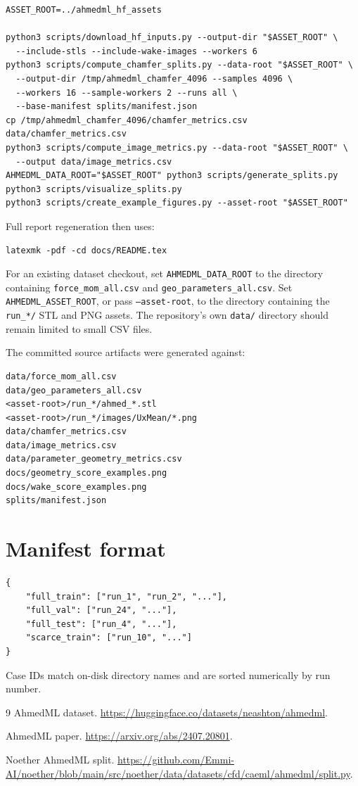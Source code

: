 \documentclass[10pt]{article}
\newcommand{\code}[1]{\texttt{#1}}
\begin{document}
\begin{verbatim}
ASSET_ROOT=../ahmedml_hf_assets

python3 scripts/download_hf_inputs.py --output-dir "$ASSET_ROOT" \
  --include-stls --include-wake-images --workers 6
python3 scripts/compute_chamfer_splits.py --data-root "$ASSET_ROOT" \
  --output-dir /tmp/ahmedml_chamfer_4096 --samples 4096 \
  --workers 16 --sample-workers 2 --runs all \
  --base-manifest splits/manifest.json
cp /tmp/ahmedml_chamfer_4096/chamfer_metrics.csv data/chamfer_metrics.csv
python3 scripts/compute_image_metrics.py --data-root "$ASSET_ROOT" \
  --output data/image_metrics.csv
AHMEDML_DATA_ROOT="$ASSET_ROOT" python3 scripts/generate_splits.py
python3 scripts/visualize_splits.py
python3 scripts/create_example_figures.py --asset-root "$ASSET_ROOT"
\end{verbatim}

Full report regeneration then uses:

\begin{verbatim}
latexmk -pdf -cd docs/README.tex
\end{verbatim}

For an existing dataset checkout, set \code{AHMEDML\_DATA\_ROOT} to the
directory containing \code{force\_mom\_all.csv} and
\code{geo\_parameters\_all.csv}. Set \code{AHMEDML\_ASSET\_ROOT}, or pass
\code{--asset-root}, to the directory containing the \code{run\_*/} STL and
PNG assets. The repository's own \code{data/} directory should remain limited
to small CSV files.

The committed source artifacts were generated against:

\begin{verbatim}
data/force_mom_all.csv
data/geo_parameters_all.csv
<asset-root>/run_*/ahmed_*.stl
<asset-root>/run_*/images/UxMean/*.png
data/chamfer_metrics.csv
data/image_metrics.csv
data/parameter_geometry_metrics.csv
docs/geometry_score_examples.png
docs/wake_score_examples.png
splits/manifest.json
\end{verbatim}

\section*{Manifest format}

\begin{verbatim}
{
    "full_train": ["run_1", "run_2", "..."],
    "full_val": ["run_24", "..."],
    "full_test": ["run_4", "..."],
    "scarce_train": ["run_10", "..."]
}
\end{verbatim}

Case IDs match on-disk directory names and are sorted numerically by run number.

{\small
\begin{thebibliography}{9}
AhmedML dataset. \url{https://huggingface.co/datasets/neashton/ahmedml}.

AhmedML paper. \url{https://arxiv.org/abs/2407.20801}.

\bibitem{noether_split}
Noether AhmedML split. \url{https://github.com/Emmi-AI/noether/blob/main/src/noether/data/datasets/cfd/caeml/ahmedml/split.py}.
\end{thebibliography}
}
\end{document}

